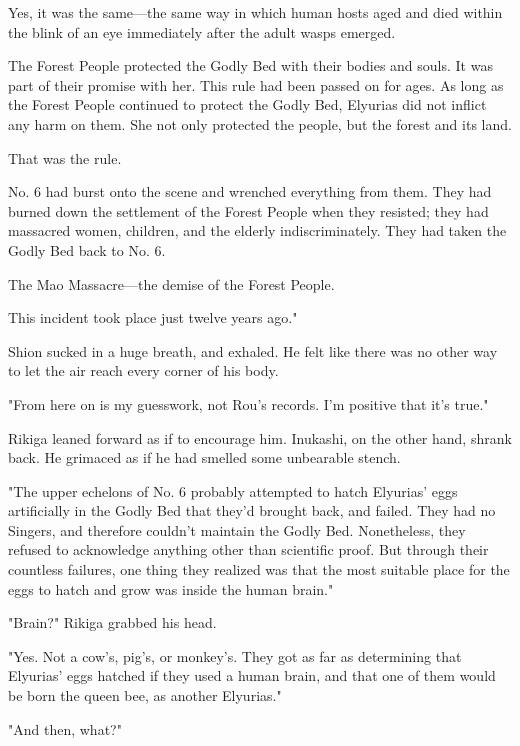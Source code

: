 Yes, it was the same---the same way in which human hosts aged and died
within the blink of an eye immediately after the adult wasps emerged.

The Forest People protected the Godly Bed with their bodies and souls.
It was part of their promise with her. This rule had been passed on for
ages. As long as the Forest People continued to protect the Godly Bed,
Elyurias did not inflict any harm on them. She not only protected the
people, but the forest and its land.

That was the rule.

No. 6 had burst onto the scene and wrenched everything from them. They
had burned down the settlement of the Forest People when they resisted;
they had massacred women, children, and the elderly indiscriminately.
They had taken the Godly Bed back to No. 6.

The Mao Massacre---the demise of the Forest People.

This incident took place just twelve years ago."

Shion sucked in a huge breath, and exhaled. He felt like there was no
other way to let the air reach every corner of his body.

"From here on is my guesswork, not Rou's records. I'm positive that it's
true."

Rikiga leaned forward as if to encourage him. Inukashi, on the other
hand, shrank back. He grimaced as if he had smelled some unbearable
stench.

"The upper echelons of No. 6 probably attempted to hatch Elyurias' eggs
artificially in the Godly Bed that they'd brought back, and failed. They
had no Singers, and therefore couldn't maintain the Godly Bed.
Nonetheless, they refused to acknowledge anything other than scientific
proof. But through their countless failures, one thing they realized was
that the most suitable place for the eggs to hatch and grow was inside
the human brain."

"Brain?" Rikiga grabbed his head.

"Yes. Not a cow's, pig's, or monkey's. They got as far as determining
that Elyurias' eggs hatched if they used a human brain, and that one of
them would be born the queen bee, as another Elyurias."

"And then, what\el ?"

